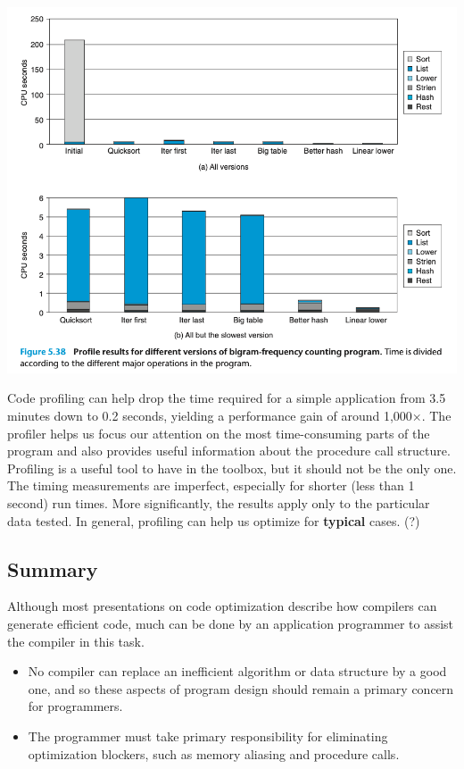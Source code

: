\documentclass[11pt]{article}
\begin{document}
\begin{center}
\includegraphics[width=.9\linewidth]{pics/figure5.38-profile-results-for-different-verions-of-bigram-frequency-counting-program.png}
\end{center}

Code profiling can help drop the time required for a simple application from 3.5 minutes down to 0.2 seconds, yielding a performance gain of around 1,000×. The profiler helps us focus our attention on the most time-consuming parts of the program and also provides useful information about the procedure call structure.\\

Profiling is a useful tool to have in the toolbox, but it should not be the only one. The timing measurements are imperfect, especially for shorter (less than 1 second) run times. More significantly, the results apply only to the particular data tested. In general, profiling can help us optimize for \textbf{typical} cases. (?)\\


\subsection{Summary}
\label{sec:org6c6a310}
Although most presentations on code optimization describe how compilers can generate efficient code, much can be done by an application programmer to assist the compiler in this task.\\
\begin{itemize}
\item No compiler can replace an inefficient algorithm or data structure by a good one, and so these aspects of program design should remain a primary concern for programmers.\\
\item The programmer must take primary responsibility for eliminating optimization blockers, such as memory aliasing and procedure calls.\\
\end{itemize}
\end{document}
